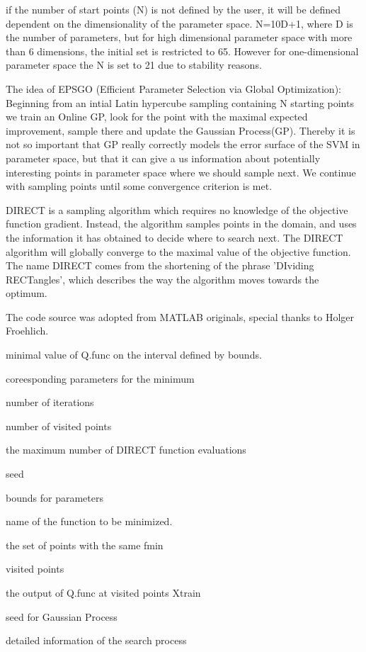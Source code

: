 \documentclass[letterpaper]{book}
\begin{document}
%
\begin{Details}\relax
if the number of start points (N)  is not defined by the user, it will be defined dependent on the dimensionality of the parameter space.
N=10D+1, where  D is the number of parameters, but for high dimensional parameter space with more than 6 dimensions,  
the initial set is restricted to 65. However for one-dimensional parameter space the N is set to 21 due to stability reasons.

The idea of EPSGO (Efficient Parameter Selection via Global Optimization): Beginning
from an intial Latin hypercube sampling containing N starting points we train
an Online GP, look for the point with the maximal expected 	improvement, sample there and update the Gaussian Process(GP). Thereby
it is not so important that GP really correctly 	models the error surface of the SVM in parameter space, but
that it can give a us information about potentially interesting 	points in parameter space where we should sample next.
We continue with sampling points until some convergence criterion is met.

DIRECT is a sampling algorithm which requires no knowledge of the objective function gradient.
Instead, the algorithm samples points in the domain, and uses the information it has obtained to decide where to
search next. The DIRECT algorithm will globally converge to the maximal value of the objective function. The name
DIRECT comes from the shortening of the phrase 'DIviding RECTangles', which describes the way the algorithm moves
towards the optimum.  

The code source was adopted from MATLAB originals, special thanks to Holger Froehlich.
\end{Details}
%
\begin{Value}
\begin{ldescription}
\item[\code{fmin }] minimal value of Q.func on the interval defined by bounds. 
\item[\code{xmin }] coreesponding parameters for the minimum
\item[\code{iter }] number of iterations
\item[\code{neval }]   number of visited points 
\item[\code{maxevals }]   the maximum number of DIRECT function evaluations 
\item[\code{seed }]   seed
\item[\code{bounds}]  bounds for parameters
\item[\code{Q.func }]   name of the function to be  minimized. 
\item[\code{points.fmin }]   the set of points with the same fmin 
\item[\code{Xtrain }]   visited points 
\item[\code{Ytrain }]   the output of Q.func at visited points Xtrain 
\item[\code{gp.seed }]  seed for Gaussian Process 
\item[\code{model.list }]  detailed information of the search process 
\end{ldescription}
\end{Value}
\end{document}
